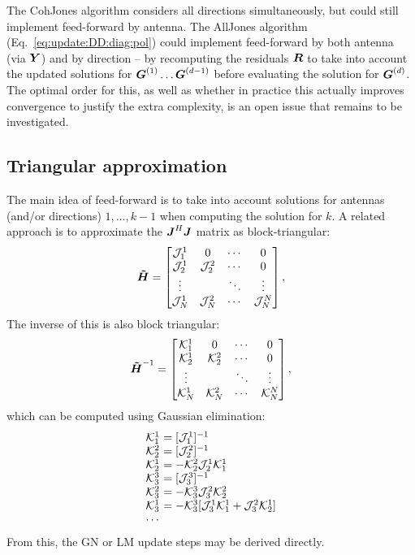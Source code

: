 \documentclass[useAMS,usenatbib]{mn2e}
\makeatletter
\newcommand{\mat}[1]{{\bmath{#1}}}
\newcommand{\JJ}{\mat{J}} %
\newcommand{\HHa}{\mat{\tilde{H}}} %
\newcommand{\RR}{\mat{R}}
\newcommand{\GG}{\mat{G}}
\newcommand{\JHJ}{\JJ^H\JJ} %
\newcommand{\Matrix}[2]{\left [ \begin{array}{@{}#1@{}}#2\end{array} \right ]}
\numberwithin{equation}{section}
\makeatother
\begin{document}
The {\sc CohJones} algorithm considers all directions simultaneously, but could still implement feed-forward by antenna.
The {\sc AllJones} algorithm (Eq.~\ref{eq:update:DD:diag:pol}) could implement feed-forward by both antenna (via $\YY$) and 
by direction -- by recomputing the residuals $\RR$ to take into account the updated solutions for $\GG^{(1)}\dots\GG^{(d-1)}$ before
evaluating the solution for $\GG^{(d)}$.  The optimal order for this, as well as whether in practice this actually 
improves convergence to justify the extra complexity, is an open issue that remains to be investigated.

\subsection{Triangular approximation}

The main idea of feed-forward is to take into account solutions for antennas (and/or directions) $1,...,k-1$ when computing the
solution for $k$. A related approach is to approximate the $\JHJ$ matrix as block-triangular:
\begin{equation}
\label{eq:JHJ:DD:block-triag}
\HHa = \Matrix{cccc}{
\JJJ^1_1 & 0 & \cdots & 0 \\
\JJJ^1_2 & \JJJ^2_2 & \cdots & 0 \\
\vdots & & \ddots &  \vdots \\
\JJJ_{N}^1 & \JJJ_{N}^2 & \cdots & \JJJ_{N}^{N} },
\end{equation}
\newcommand{\KKK}{\mathcal{K}}
The inverse of this is also block triangular:
\begin{equation}
\label{eq:JHJ:DD:block-triag-inv}
\HHa^{-1} = \Matrix{cccc}{
\KKK^1_1 & 0 & \cdots & 0 \\
\KKK^1_2 & \KKK^2_2 & \cdots & 0 \\
\vdots & & \ddots &  \vdots \\
\KKK_{N}^1 & \KKK_{N}^2 & \cdots & \KKK_{N}^{N} },
\end{equation}
which can be computed using Gaussian elimination:
\begin{equation}
\begin{array}{l@{~}l}
\KKK^1_1 &= [\JJJ^1_1]^{-1} \\
\KKK^2_2 &= [\JJJ^2_2]^{-1} \\
\KKK^1_2 &= - \KKK^2_2 \JJJ^1_2 \KKK^1_1\\
\KKK^3_3 &= [\JJJ^3_3]^{-1} \\
\KKK^2_3 &= - \KKK^3_3 \JJJ^2_3 \KKK^2_2\\
\KKK^1_3 &= - \KKK^3_3 [ \JJJ^1_3 \KKK^1_1 + \JJJ^2_3 \KKK^1_2  ]\\
\cdots
\end{array}
\end{equation}
From this, the GN or LM update steps may be derived directly.
\end{document}
